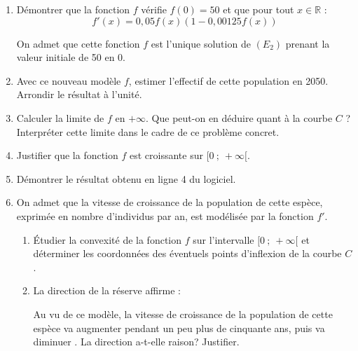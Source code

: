 \documentclass[10pt]{article}
\providecommand{\R}{\mathbb{R}}
\begin{document}
	\begin{enumerate}
		\item Démontrer que la fonction $f$ vérifie $f(0)=50$ et que pour tout $x \in \R$ :
		$$
		f'(x)=0,05 f(x)(1-0,00125 f(x))
		$$

		On admet que cette fonction $f$ est l'unique solution de $(E_{2})$ prenant la valeur initiale de 50 en 0.

		\item Avec ce nouveau modèle $f$, estimer l'effectif de cette population en 2050. Arrondir le résultat à l'unité.

		\item Calculer la limite de $f$ en $+\infty$. Que peut-on en déduire quant à la courbe $C$ ? Interpréter cette limite dans le cadre de ce problème concret.

		\item Justifier que la fonction $f$ est croissante sur $[0 ~;~+\infty[$.

		\item Démontrer le résultat obtenu en ligne 4 du logiciel.

		\item On admet que la vitesse de croissance de la population de cette espèce, exprimée en nombre d'individus par an, est modélisée par la fonction $f'$.
		\begin{enumerate}
			\item Étudier la convexité de la fonction $f$ sur l'intervalle $[0 ~;~ +\infty[$ et déterminer les coordonnées des éventuels points d'inflexion de la courbe $C$.

			\item La direction de la réserve affirme :

			\og Au vu de ce modèle, la vitesse de croissance de la population de cette espèce va augmenter pendant un peu plus de cinquante ans, puis va diminuer \fg{}. La direction a-t-elle raison? Justifier.
		\end{enumerate}
	\end{enumerate}

\bigskip
\end{document}
